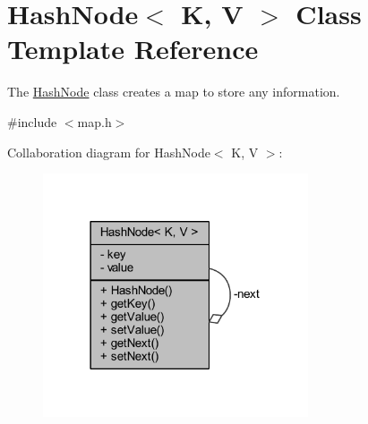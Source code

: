 \hypertarget{class_hash_node}{}\section{Hash\+Node$<$ K, V $>$ Class Template Reference}
\label{class_hash_node}


The \hyperlink{class_hash_node}{Hash\+Node} class creates a map to store any information.  




{\ttfamily \#include $<$map.\+h$>$}



Collaboration diagram for Hash\+Node$<$ K, V $>$\+:
\nopagebreak
\begin{figure}[H]
\begin{center}
\leavevmode
\includegraphics[width=222pt]{class_hash_node__coll__graph}
\end{center}
\end{figure}
